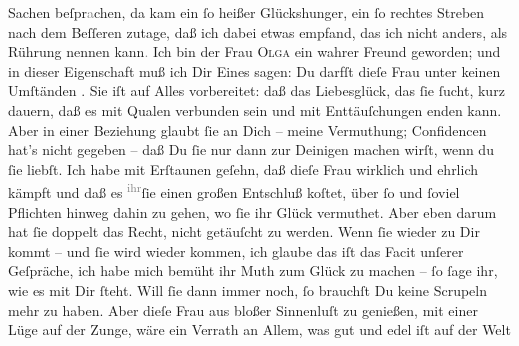 					Sachen beſpr\textcolor{gray}{a}chen, da kam ein ſo heißer Glückshunger, ein ſo
					rechtes Streben nach dem Beſſeren zutage, daß ich dabei etwas empfand, das ich
					nicht anders, als Rührung nennen kann\textcolor{gray}{.} Ich bin der Frau \textsc{Olga} ein wahrer Freund geworden; und in dieser Eigenschaft muß ich Dir Eines
					sagen: Du darfſt dieſe Frau unter keinen Umſtänden \label{K_L02648-3v}\label{K_L02648-3}. Sie iſt auf Alles vorbereitet: daß das Liebesglück, das ſie
					ſucht, kurz dauern, daß es mit Qualen verbunden sein und mit Enttäuſchungen
					enden kann. Aber in einer Beziehung glaubt ſie an Dich – meine Vermuthung; {\pb}Confidencen hat’s nicht gegeben – daß Du ſie
					nur dann zur Deinigen machen wirſt, wenn du ſie liebſt. Ich habe mit Erſtaunen
					geſehn, daß dieſe Frau
					wirklich und ehrlich kämpft und daß es \substVorne{}\textsuperscript{\textcolor{gray}{ihr}}\substDazwischen{}ſie\substHinten{} einen großen Entschluß koſtet, über ſo und ſoviel Pflichten hinweg
					dahin zu gehen, wo ſie ihr Glück vermuthet. Aber eben darum hat ſie doppelt das
					Recht, nicht getäuſcht zu werden. Wenn ſie wieder zu Dir kommt – und ſie wird
					wieder kommen, ich glaube das iſt das Facit unſerer Geſpräche, ich habe mich
					bemüht ihr Muth zum Glück zu machen – ſo ſage ihr, wie es mit Dir ſteht. Will
					ſie dann immer noch, ſo brauchſt Du keine Scrupeln {\pb}mehr zu haben. Aber dieſe Frau aus bloßer Sinnenluſt zu
					genießen, mit einer Lüge auf der Zunge, wäre ein Verrath an Allem, was gut und
					edel iſt auf der Welt{\dotsfour}\pend
           
